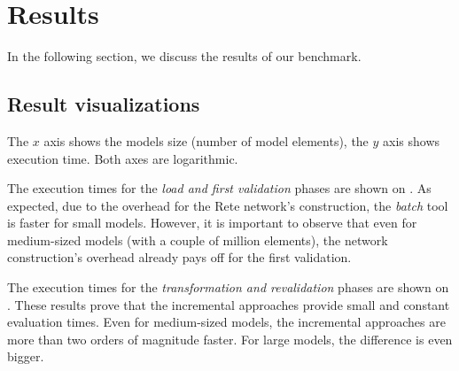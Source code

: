 \section{Results}
\label{evaluation-results}

In the following section, we discuss the results of our benchmark.

\subsection{Result visualizations}




The $x$ axis shows the models size (number of model elements), the $y$ axis shows execution time. Both axes are logarithmic. 

The execution times for the \emph{load and first validation} phases are shown on .
As expected, due to the overhead for the Rete network's construction, the \emph{batch} tool is faster for small models. However, it is important to observe that even for medium-sized models (with a couple of million elements), the network construction's overhead already pays off for the first validation.




The execution times for the \emph{transformation and revalidation} phases are shown on . These results prove that the incremental approaches provide small and constant evaluation times. Even for medium-sized models, the incremental approaches are more than two orders of magnitude faster. For large models, the difference is even bigger.

